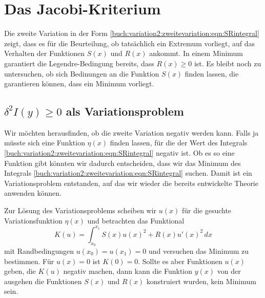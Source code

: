 %
%
%
\section{Das Jacobi-Kriterium
\label{buch:variation2:section:jacobi}}
Die zweite Variation in der Form
\eqref{buch:variation2:zweitevariation:eqn:SRintegral}
zeigt, dass es für die Beurteilung, ob tatsächlich ein Extremum 
vorliegt, auf das Verhalten der Funktionen $S(x)$  und $R(x)$ ankommt.
In einem Minimum garantiert die Legendre-Bedingung bereits,
dass $R(x)\ge 0$ ist.
Es bleibt noch zu untersuchen, ob sich Bedinungen an die Funktion
$S(x)$ finden lassen, die garantieren können, dass ein Minimum
vorliegt.

%
%
\subsection{$\delta^2 I(y)\ge 0$ als Variationsproblem
\label{buch:variation2:jacobi:subsection:delta2I}}
Wir möchten herausfinden, ob die zweite Variation negativ werden kann.
Falls ja müsste sich eine Funktion $\eta(x)$ finden lassen, für die
der Wert des Integrals
\eqref{buch:variation2:zweitevariation:eqn:SRintegral}
negativ ist.
Ob es so eine Funktion gibt könnten wir dadurch entscheiden, dass wir
das Minimum des Integrals
\eqref{buch:variation2:zweitevariation:eqn:SRintegral}
suchen.
Damit ist ein Variationsproblem entstanden, auf das wir wieder die
bereits entwickelte Theorie anwenden können.

Zur Lösung des Variationsproblems scheiben wir $u(x)$ für die gesuchte
Variationsfunktion $\eta(x)$ und betrachten das Funktional
\begin{equation}
K(u)
=
\int_{x_0}^{x_1}
S(x) u(x)^2 + R(x) u'(x)^2
\,dx
\label{buch:variation2:jacobi:eqn:K}
\end{equation}
mit Randbedingungen $u(x_0)=u(x_1)=0$ und versuchen das Minimum
zu bestimmen.
Für $u(x)=0$ ist $K(0)=0$.
Sollte es aber Funktionen $u(x)$ geben, die $K(u)$ negativ machen,
dann kann die Funktion $y(x)$ von der ausgehen die Funktionen $S(x)$
und $R(x)$ konstruiert wurden, kein Minimum sein.

%
%
